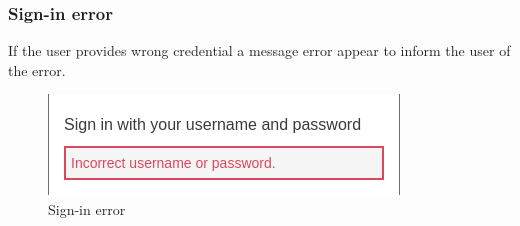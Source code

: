 \subsubsection{Sign-in error}
If the user provides wrong credential a message error appear to inform the user of the error.
\begin{figure}[!ht]
    \caption{Sign-in error}
    \vspace{10px}
    \includegraphics[scale=0.3]{../../../../Images/userManual/singInError.png}
    \centering
\end{figure}
\newpage

